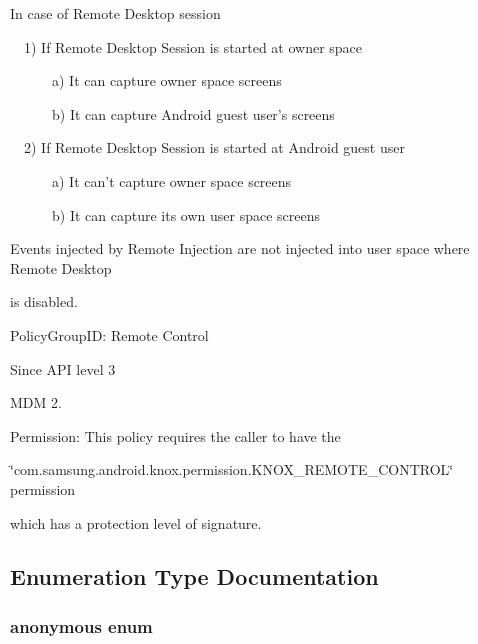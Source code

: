 \par


\-In case of \-Remote \-Desktop session\par


~~1) \-If \-Remote \-Desktop \-Session is started at owner space\par


~~~~~~a) \-It can capture owner space screens\par


~~~~~~b) \-It can capture \-Android guest user's screens\par


~~2) \-If \-Remote \-Desktop \-Session is started at \-Android guest user\par


~~~~~~a) \-It can't capture owner space screens\par


~~~~~~b) \-It can capture its own user space screens\par


\-Events injected by \-Remote \-Injection are not injected into user space where \-Remote \-Desktop

is disabled.

\par


\begin{DoxyParagraph}{\-Policy\-Group\-I\-D\-: }
\-Remote \-Control
\end{DoxyParagraph}
\begin{DoxySince}{\-Since}
\-A\-P\-I level 3

\-M\-D\-M 2.
\end{DoxySince}
\begin{DoxyParagraph}{\-Permission\-: }
\-This policy requires the caller to have the
\end{DoxyParagraph}
\char`\"{}com.\-samsung.\-android.\-knox.\-permission.\-K\-N\-O\-X\-\_\-\-R\-E\-M\-O\-T\-E\-\_\-\-C\-O\-N\-T\-R\-O\-L\char`\"{} permission

which has a protection level of signature. 

\subsection{\-Enumeration \-Type \-Documentation}
\hypertarget{namespaceknoxremotedesktop_abb203e9b63692eb529da34e7e68158ec}{\subsubsection[{anonymous enum}]{\setlength{\rightskip}{0pt plus 5cm}anonymous enum}}\label{namespaceknoxremotedesktop_abb203e9b63692eb529da34e7e68158ec}


